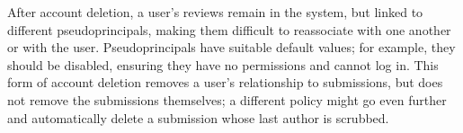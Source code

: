 After account deletion, a user's reviews remain in the system, but linked to different
pseudoprincipals, making them difficult to reassociate with one another or with the user.
%
Pseudoprincipals have suitable default values; for example, they should be disabled, ensuring they
have no permissions and cannot log in.
%
This form of account deletion removes a user's relationship to submissions, but does not remove the
submissions themselves; a different policy might go even further and automatically delete a
submission whose last author is scrubbed.

